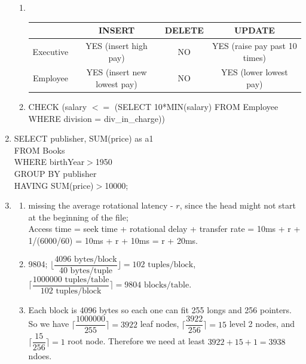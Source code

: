 \documentclass{article}
\begin{document}
\begin{enumerate}
\begin{enumerate}
                  \item $ $
                        \begin{center}
                              \begin{tabular}{|c|c|c|c|}
                                    \hline
                                              & INSERT                      & DELETE & UPDATE                        \\
                                    \hline
                                    Executive & YES (insert high pay)       & NO     & YES (raise pay past 10 times) \\
                                    \hline
                                    Employee  & YES (insert new lowest pay) & NO     & YES (lower lowest pay)        \\
                                    \hline
                              \end{tabular}
                        \end{center}
                  \item CHECK (salary $<=$ (SELECT 10*MIN(salary) FROM Employee WHERE division = div\_in\_charge))
            \end{enumerate}
      \item SELECT publisher, SUM(price) as a1\\FROM Books\\WHERE birthYear$>$1950\\GROUP BY publisher\\HAVING SUM(price)$>$10000;
      \item
            \begin{enumerate}
                  \item missing the average rotational latency - $r$, since the head might not start at the beginning of the file;\\Access time = seek time + rotational delay + transfer rate = 10ms + r + 1/(6000/60) = 10ms + r + 10ms = r + 20ms.
                  \item 9804; $\lfloor\dfrac{4096\text{ bytes/block}}{40\text{ bytes/tuple}}\rfloor=102\text{ tuples/block}$, $\lceil\dfrac{1000000\text{ tuples/table}}{102\text{ tuples/block}}\rceil=9804\text{ blocks/table}$.
                  \item Each block is 4096 bytes so each one can fit 255 longs and 256 pointers. So we have $\lceil\dfrac{1000000}{255}\rceil=3922$ leaf nodes, $\lceil\dfrac{3922}{256}\rceil=15$ level 2 nodes, and $\lceil\dfrac{15}{256}\rceil=1$ root node. Therefore we need at least $3922+15+1=3938$ ndoes.

\end{enumerate}
\end{enumerate}
\end{document}
